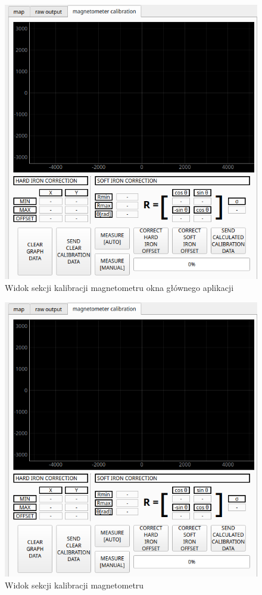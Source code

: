 \begin{figure}[ht]
	\centering
		\includegraphics[width=1\linewidth]{rys/main-app-view-magnetom.PNG}
	\caption{Widok sekcji kalibracji magnetometru okna głównego aplikacji}
	\label{fig:main-app-mag-section}
\end{figure}




\begin{figure}[ht]
	\centering
		\includegraphics[width=1\linewidth]{rys/main-app-view-magnetom.PNG}
	\caption{Widok sekcji kalibracji magnetometru}
	\label{fig:main-app-mag-section}
\end{figure}


